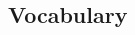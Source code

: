 \documentclass[10pt,landscape,letter]{article}
\begin{document}
\small
\begin{multicols*}{5}
\section{Vocabulary}







\end{multicols*}
\end{document}
